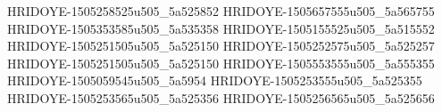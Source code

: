 HRIDOYE-1505258525u505_5a525852
HRIDOYE-1505657555u505_5a565755
HRIDOYE-1505353585u505_5a535358
HRIDOYE-1505155525u505_5a515552
HRIDOYE-1505251505u505_5a525150
HRIDOYE-1505252575u505_5a525257
HRIDOYE-1505251505u505_5a525150
HRIDOYE-1505553555u505_5a555355
HRIDOYE-1505059545u505_5a5954
HRIDOYE-1505253555u505_5a525355
HRIDOYE-1505253565u505_5a525356
HRIDOYE-1505256565u505_5a525656
